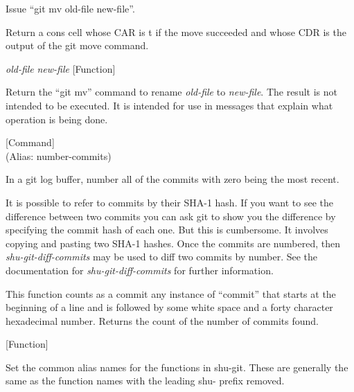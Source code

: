 \begin{doc-string}
Issue ``git mv old-file new-file''.

Return a cons cell whose CAR is t if the move succeeded and whose CDR is the
output of the git move command.
\end{doc-string}

\vspace{1em}
\noindent
{}
\usebox{\funcname}\emph{old-file} \emph{new-file}
 \hfill [Function]

\begin{doc-string}
Return the ``git mv'' command to rename \emph{old-file} to \emph{new-file}.  The result is
not intended to be executed.  It is intended for use in messages that explain
what operation is being done.
\end{doc-string}

\vspace{1em}
\noindent
{}
\usebox{\funcname}
 \hfill [Command]\\%
 (Alias: number-commits)

\begin{doc-string}
In a git log buffer, number all of the commits with zero being the most
recent.

It is possible to refer to commits by their SHA-1 hash.  If you want to see the
difference between two commits you can ask git to show you the difference by
specifying the commit hash of each one.  But this is cumbersome.  It involves
copying and pasting two SHA-1 hashes.  Once the commits are numbered, then
\emph{shu-git-diff-commits} may be used to diff two commits by number.  See the
documentation for \emph{shu-git-diff-commits} for further information.

This function counts as a commit any instance of ``commit'' that starts at the
beginning of a line and is followed by some white space and a forty character
hexadecimal number.  Returns the count of the number of commits found.
\end{doc-string}

\vspace{1em}
\noindent
{}
\usebox{\funcname}
 \hfill [Function]

\begin{doc-string}
Set the common alias names for the functions in shu-git.
These are generally the same as the function names with the leading
shu- prefix removed.
\end{doc-string}

